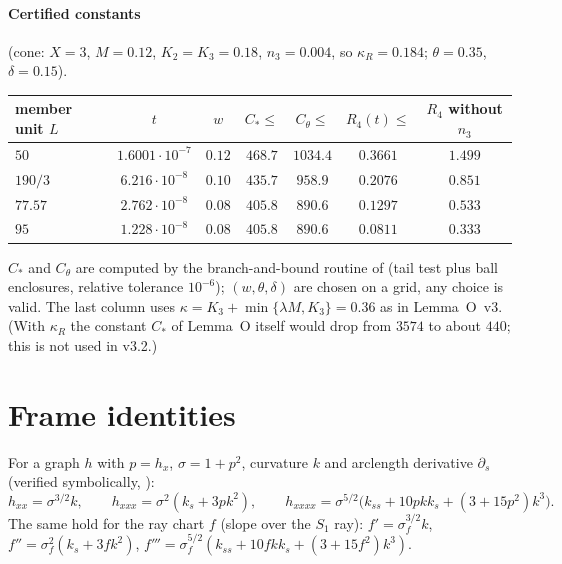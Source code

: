 \documentclass[11pt]{article}
\begin{document}
\paragraph{Certified constants} (cone: $X=3$, $M=0.12$, $K_2=K_3=0.18$, $n_3=0.004$, so $\kappa_R=0.184$; $\theta=0.35$, $\delta=0.15$).
\begin{center}\small\begin{tabular}{lcccccc}\toprule
member unit $L$ & $t$ & $w$ & $C_*\le$ & $C_\theta\le$ & $R_4(t)\le$ & $R_4$ without $n_3$\\\midrule
$50$ & $1.6001\cdot10^{-7}$ & $0.12$ & $468.7$ & $1034.4$ & $0.3661$ & $1.499$\\
$190/3$ & $6.216\cdot10^{-8}$ & $0.10$ & $435.7$ & $958.9$ & $0.2076$ & $0.851$\\
$77.57$ & $2.762\cdot10^{-8}$ & $0.08$ & $405.8$ & $890.6$ & $0.1297$ & $0.533$\\
$95$ & $1.228\cdot10^{-8}$ & $0.08$ & $405.8$ & $890.6$ & $0.0811$ & $0.333$\\\bottomrule
\end{tabular}\end{center}
$C_*$ and $C_\theta$ are computed by the branch-and-bound routine of  (tail test plus ball enclosures, relative tolerance $10^{-6}$); $(w,\theta,\delta)$ are chosen on a grid, any choice is valid. The last column uses $\kappa=K_3+\min\{\lambda M,K_3\}=0.36$ as in Lemma~O~v3. (With $\kappa_R$ the constant $C_*$ of Lemma~O itself would drop from $3574$ to about $440$; this is not used in v3.2.)

\section{Frame identities}
For a graph $h$ with $p=h_x$, $\sigma=1+p^2$, curvature $k$ and arclength derivative $\partial_s$ (verified symbolically, ):
\[h_{xx}=\sigma^{3/2}k,\qquad h_{xxx}=\sigma^2(k_s+3pk^2),\qquad h_{xxxx}=\sigma^{5/2}\bigl(k_{ss}+10pkk_s+(3+15p^2)k^3\bigr).\]
The same hold for the ray chart $f$ (slope over the $S_1$ ray): $f'=\sigma_f^{3/2}k$, $f''=\sigma_f^2(k_s+3fk^2)$, $f'''=\sigma_f^{5/2}(k_{ss}+10fkk_s+(3+15f^2)k^3)$.
\end{document}
